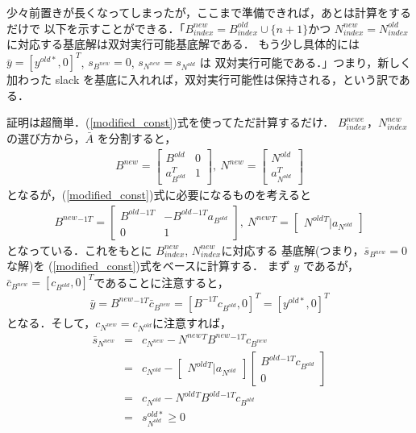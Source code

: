 \documentclass[11pt, a4]{article}
\begin{document}
少々前置きが長くなってしまったが，ここまで準備できれば，あとは計算をするだけで
以下を示すことができる．「$B_{index}^{new} = B^{old}_{index} \cup \{n + 1\}$かつ
  $N^{new}_{index} = N_{index}^{old}$に対応する基底解は双対実行可能基底解である．
  もう少し具体的には ${\bar y} = [y^{old *}, 0]^T$, $s_{B^{new}} = 0$, $s_{N^{new}} = s_{N^{old}}$ は
双対実行可能である．」つまり，新しく加わった slack を基底に入れれば，双対実行可能性は保持される，という訳である．

証明は超簡単．(\ref{modified_const})式を使ってただ計算するだけ．
$B^{newe}_{index}$，$N^{new}_{index}$の選び方から，${\bar A}$ を分割すると，
\begin{eqnarray}
  B^{new} = \left[
    \begin{array}{c|c}
      B^{old}&0\nonumber\\
      \hline
      a_{B^{old}}^T&1
    \end{array}
    \right],\
  N^{new} = \left[
    \begin{array}{c}
      N^{old}\nonumber\\
      \hline
      a_{N^{old}}^T
    \end{array}
    \right]  
\end{eqnarray}
となるが，(\ref{modified_const})式に必要になるものを考えると
\begin{eqnarray}
  B^{new}{}^{-1 T} = \left[
    \begin{array}{c|c}
      B^{old}{}^{-1 T}&-B^{old}{}^{-1 T}a_{B^{old}}\nonumber\\
      \hline
      0&1
    \end{array}
    \right],\
  N^{new}{}^{T} = \left[
    \begin{array}{c|c}
      N^{old}{}^{T}|a_{N^{old}}
    \end{array}
    \right]  
\end{eqnarray}
となっている．これをもとに $B_{index}^{new}$, $N^{new}_{index}$に対応する
基底解(つまり，${\bar s}_{B^{new}} = 0$な解)を (\ref{modified_const})式をベースに計算する．
まず $y$ であるが，${\bar c}_{B^{new}} = [c_{B^{old}}, 0]^T$であることに注意すると，
\begin{eqnarray}
  {\bar y} = B^{new}{}^{-1 T}{\bar c}_{B^{new}} = [B^{-1 T}c_{B^{old}}, 0]^T = [y^{old *}, 0]^T
\end{eqnarray}
となる．そして，$c_{N^{new}} = c_{N^{old}}$に注意すれば，
\begin{eqnarray}
  {\bar s}_{N^{new}} &=& c_{N^{new}} - N^{new}{}^T B^{new}{}^{-1 T}c_{B^{new}}\nonumber\\
  &=& c_{N^{old}} -
  \left[
    \begin{array}{c|c}
      N^{old}{}^{T}|a_{N^{old}}
    \end{array}
    \right]
  \left[
    \begin{array}{c}
      B^{old}{}^{-1 T}c_{B^{old}}\\
      \hline
      0
    \end{array}
    \right]\nonumber\\
  &=& c_{N^{old}} - N^{old}{}^{T}B^{old}{}^{-1 T} c_{B^{old}} \nonumber\\
  &=& s^{old*}_{N^{old}} \geq 0
\end{eqnarray}
\end{document}
